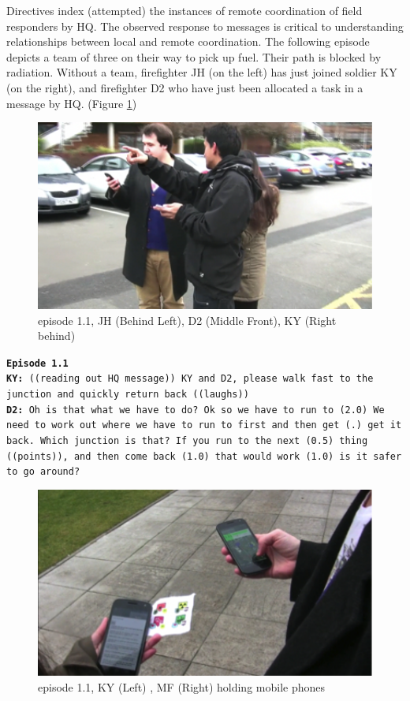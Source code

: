 Directives index (attempted) the instances of remote coordination of field responders by HQ. The observed response to messages is critical to understanding relationships between local and remote coordination. The following episode depicts a team of three on their way to pick up fuel. Their path is blocked by radiation. Without a team, firefighter JH (on the left) has just joined soldier KY (on the right), and firefighter D2 who have just been allocated a task in a message by HQ. (Figure \ref{fig:study1ep11})\\

\begin{figure}[h]
  \centering
  \includegraphics[width=1\textwidth]{img/study1/ep1/ep11}
  \caption{episode 1.1, JH (Behind Left), D2 (Middle Front), KY (Right behind)}
  \label{fig:study1ep11}
\end{figure}


\noindent \texttt{\textbf{Episode 1.1}\\
\textbf{KY:} ((reading out HQ message)) KY and D2, please walk fast to the junction and quickly return back ((laughs))\\
\textbf{D2:} Oh is that what we have to do? Ok so we have to run to (2.0) We need to work out where we have to run to first and then get (.) get it back. Which junction is that? If you run to the next (0.5) thing ((points)), and then come back (1.0) that would work (1.0) is it safer to go around?\\
}


\begin{figure}[h]
  \centering
  \includegraphics[width=1\textwidth]{img/study1/ep1/ep12}
  \caption{episode 1.1, KY (Left) , MF (Right) holding mobile phones}
  \label{fig:study1ep12}
\end{figure}


